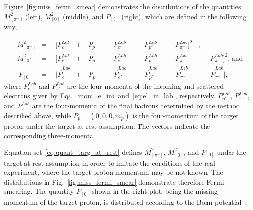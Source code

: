 Figure~\ref{fig:miss_fermi_smear} demonstrates the distributions of the quantities $M^{2}_{[\pi^{-}]}$ (left), $M^{2}_{[0]}$ (middle), and $P_{[0]}$ (right), which are defined in the following way,


\begin{equation}
\begin{aligned}\label{eq:quant_targ_at_rest}
&M^{2}_{[\pi^{-}]} &= &~~[P_{e}^{Lab}&+~&P_{p}&-~&P_{e'}^{Lab}&-~&P_{p'}^{Lab}&-~&P_{\pi^{+}}^{Lab}]^{2}&,\\[5pt]
&M^{2}_{[0]} &= &~~[P_{e}^{Lab}&+~&P_{p}&-~&P_{e'}^{Lab}&-~&P_{p'}^{Lab}&-~&P_{\pi^{+}}^{Lab}&-~&P_{\pi^{-}}^{Lab} ]^{2} \textrm{,~and}\\[5pt]
&~P_{[0]} &= &~~|\overrightarrow{P}_{e}^{Lab}&+~&\overrightarrow{P}_{p}&-~&\overrightarrow{P}_{e'}^{Lab}&-~&\overrightarrow{P}_{p'}^{Lab}&-~&\overrightarrow{P}_{\pi^{+}}^{Lab}&-~&\overrightarrow{P}_{\pi^{-}}^{Lab} |,
\end{aligned}
\end{equation}
where $P_{e}^{Lab}$ and $P_{e'}^{Lab}$ are the four-momenta of the incoming and scattered electrons given by Eqs.~\eqref{mom_e_ini} and~\eqref{eq:el_in_lab}, respectively. $P_{p'}^{Lab}$, $P_{\pi^{+}}^{Lab}$, and $P_{\pi^{-}}^{Lab}$ are the four-momenta of the final hadrons determined by the method described above, while $P_{p}=(0,0,0,m_{p})$ is the four-momentum of the target proton under the target-at-rest assumption. The vectors indicate the corresponding three-momenta.

Equation set~\eqref{eq:quant_targ_at_rest} defines $M^{2}_{[\pi^{-}]}$, $M^{2}_{[0]}$, and $P_{[0]}$ under the target-at-rest assumption in order to imitate the conditions of the real experiment, where the target proton momentum may be not known.  The distributions in Fig.~\ref{fig:miss_fermi_smear}  demonstrate therefore Fermi smearing. The quantity $P_{[0]}$ shown in the right plot, being the missing momentum of the target proton, is distributed according to the Bonn potential~\cite{Machleidt:1987hj}. 























  

